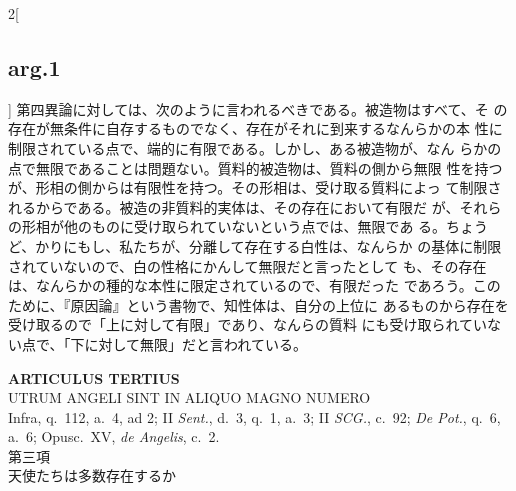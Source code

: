 \documentclass[paper=a4paper,fontsize=10pt,jafontsize=9pt,titlepage]{jlreq}
\begin{document}
\begin{paracol}{2}[\subsection{arg.1}]
第四異論に対しては、次のように言われるべきである。被造物はすべて、そ
 の存在が無条件に自存するものでなく、存在がそれに到来するなんらかの本
 性に制限されている点で、端的に有限である。しかし、ある被造物が、なん
 らかの点で無限であることは問題ない。質料的被造物は、質料の側から無限
 性を持つが、形相の側からは有限性を持つ。その形相は、受け取る質料によっ
 て制限されるからである。被造の非質料的実体は、その存在において有限だ
 が、それらの形相が他のものに受け取られていないという点では、無限であ
 る。ちょうど、かりにもし、私たちが、分離して存在する白性は、なんらか
 の基体に制限されていないので、白の性格にかんして無限だと言ったとして
 も、その存在は、なんらかの種的な本性に限定されているので、有限だった
 であろう。このために、『原因論』という書物で、知性体は、自分の上位に
 あるものから存在を受け取るので「上に対して有限」であり、なんらの質料
 にも受け取られていない点で、「下に対して無限」だと言われている。

\end{paracol}
\newpage



{}
\setcounter{section}{3}
\setcounter{subsection}{0}
\begin{center}
 {\Large {\bfseries ARTICULUS TERTIUS}}\\
 {\large UTRUM ANGELI SINT IN ALIQUO MAGNO NUMERO}\\
 {\footnotesize Infra, q.~112, a.~4, ad 2; II {\itshape Sent.}, d.~3,
 q.~1, a.~3; II {\itshape SCG.}, c.~92; {\itshape De Pot.}, q.~6, a.~6;
 Opusc.~XV, {\itshape de Angelis}, c.~2.}\\
 {\Large 第三項\\天使たちは多数存在するか}
\end{center}
\end{document}
